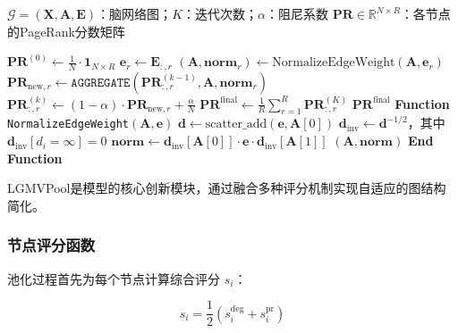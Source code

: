 \begin{algorithm}
  \centering
  \caption{多关系图PageRank计算算法}
  \label{alg:pagerank}
  \small
  \begin{algorithmic}[1]
  \REQUIRE $\mathcal{G} = (\mathbf{X}, \mathbf{A}, \mathbf{E})$：脑网络图；$K$：迭代次数；$\alpha$：阻尼系数
  \ENSURE $\mathbf{PR} \in \mathbb{R}^{N \times R}$：各节点的PageRank分数矩阵

  \STATE {}
  \STATE $\mathbf{PR}^{(0)} \leftarrow \frac{1}{N} \cdot \mathbf{1}_{N \times R}$
  \STATE {}
    \STATE $\mathbf{e}_r \leftarrow \mathbf{E}_{:, r}$
    \STATE $(\mathbf{A}, \mathbf{norm}_r) \leftarrow \text{NormalizeEdgeWeight}(\mathbf{A}, \mathbf{e}_r)$
      \STATE {}
      \STATE $\mathbf{PR}_{\text{new}, r} \leftarrow \texttt{AGGREGATE}(\mathbf{PR}^{(k-1)}_{:, r}, \mathbf{A}, \mathbf{norm}_r)$
      \STATE {}
      \STATE $\mathbf{PR}^{(k)}_{:, r} \leftarrow (1 - \alpha) \cdot \mathbf{PR}_{\text{new}, r} + \frac{\alpha}{N}$
    \ENDFOR
  \ENDFOR
  \STATE {}
  \STATE $\mathbf{PR}^{\text{final}} \leftarrow \frac{1}{R} \sum_{r=1}^{R} \mathbf{PR}^{(K)}_{:, r}$
  \RETURN $\mathbf{PR}^{\text{final}}$
  \STATE {}
  \STATE \textbf{Function} \texttt{NormalizeEdgeWeight}$(\mathbf{A}, \mathbf{e})$
    \STATE $\mathbf{d} \leftarrow \text{scatter\_add}(\mathbf{e}, \mathbf{A}[0])$
    \STATE $\mathbf{d}_{\text{inv}} \leftarrow \mathbf{d}^{-1/2}$，其中 $\mathbf{d}_{\text{inv}}[d_i = \infty] = 0$
    \STATE $\mathbf{norm} \leftarrow \mathbf{d}_{\text{inv}}[\mathbf{A}[0]] \cdot \mathbf{e} \cdot \mathbf{d}_{\text{inv}}[\mathbf{A}[1]]$
    \RETURN $(\mathbf{A}, \mathbf{norm})$
  \STATE \textbf{End Function}
  \end{algorithmic}
\end{algorithm}

\newpage

LGMVPool是模型的核心创新模块，通过融合多种评分机制实现自适应的图结构简化。

\subsubsection{节点评分函数}

池化过程首先为每个节点计算综合评分 $s_i$：

\begin{equation}
s_i = \frac{1}{2} \left( s_i^{\text{deg}} + s_i^{\text{pr}} \right)
\end{equation}

